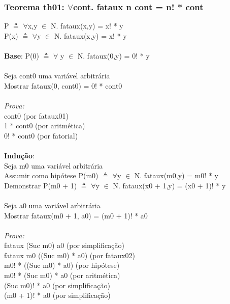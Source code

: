 \documentclass{article}
\begin{document}
\subsubsection{Teorema th01: $\forall$cont. fataux n cont = n! * cont}
P $\triangleq$ $\forall$x,y $\in$ N. fataux(x,y) = x! * y
\\P(x) $\triangleq$ $\forall$y $\in$ N. fataux(x,y) = x! * y
\\
\\\textbf{Base}: P(0) $\triangleq$ $\forall$ y $\in$ N. fataux(0,y) = 0! * y
\\
\\Seja cont0 uma variável arbitrária 
\\Mostrar fataux(0, cont0) = 0! * cont0
\\
\\\textit{Prova:}
\\cont0 (por fataux01)
\\1 * cont0 (por aritmética)
\\0! * cont0 (por fatorial)
\\
\\\textbf{Indução}:
\\Seja m0 uma variável arbitrária
\\Assumir como hipótese P(m0) $\triangleq$ $\forall$y $\in$ N. fataux(m0,y) = m0! * y
\\Demonstrar P(m0 + 1) $\triangleq$ $\forall$y $\in$ N. fataux(x0 + 1,y) = (x0 + 1)! * y
\\
\\Seja a0 uma variável arbitrária 
\\Mostrar fataux(m0 + 1, a0) = (m0 + 1)! * a0
\\
\\\textit{Prova:}
\\fataux (Suc m0) a0 (por simplificação)
\\fataux m0 ((Suc m0) * a0) (por fataux02) 
\\m0! * ((Suc m0) * a0) (por hipótese)
\\m0! * (Suc m0) * a0 (por aritmética)
\\(Suc m0)! * a0 (por simplificação)
\\(m0 + 1)! * a0 (por simplificação)
\end{document}
